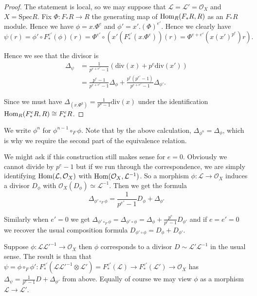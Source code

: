 \documentclass[a4paper,12pt]{book}
\newcommand{\Hom}{\textup{Hom}}
\newcommand{\Fe}[1][e]{F^{#1}_{*}}
\newcommand{\ox}[1][X]{\mathcal{O}_{#1}}
\begin{document}
\begin{proof}
	
	The statement is local, so we may suppose that $\mathcal{L}=\mathcal{L}'=\mathcal{O}_{X}$ and $X= \text{Spec}R$. Fix $\Phi: F_{*}R \to R$ the generating map of $\Hom_{R}(F_{*}R,R)$ as an $F_{*}R$ module. Hence we have $\phi=x.\Phi^{e}$ and $\phi'=x'.(\Phi)^{e'}$. Hence we clearly have $$\psi(r)=\phi'\circ F_{*}^{e'}(\phi)(r)= \Phi^{e'}\circ (x'(F_{*}^{e'}(x.\Phi^{e}))(r)=\Phi^{e+e'}(x(x')^{p^{e}})r).$$
	
	
	Hence we see that the divisor is 
	\begin{align*}
	\Delta_{\psi} &= \frac{1}{p^{e+e'}-1}(\text{div}(x) + p^{e}\text{div}(x')) \\
	&=\frac{p^{e}-1}{p^{e+e'}-1}\Delta_{\phi} + \frac{p^{e}(p^{e'}-1)}{p^{e+e'}-1}\Delta_{\phi'}.
	\end{align*}
	
	Since we must have $\Delta_{(x.\Phi^{k})}= \frac{1}{p^{k}-1} \text{div}(x)$ under the identification $\Hom_{R}(\Fe R,R) \cong \Fe R$.

	
\end{proof}

We write $\phi^{n}$ for $\phi^{n-1}\circ_{F} \phi$. Note that by the above calculation, $\Delta_{\phi^{n}}=\Delta_{\phi}$, which is why we require the second part of the equivalence relation.

\begin{remark}\label{R-twist}

We might ask if this construction still makes sense for $e=0$. Obviously we cannot divide by $p^{e}-1$ but if we run through the correspondence, we are simply identifying $\Hom(\mathcal{L},\ox)$ with $\Hom(\ox,\mathcal{L}^{-1})$. So a morphism $\phi: \mathcal{L} \to \ox$ induces a divisor $D_{\phi}$ with $\ox(D_{\phi})\simeq \mathcal{L}^{-1}$. Then we get the formula
\[\Delta_{\phi' \circ_{F} \phi}= \frac{1}{p^{e'}-1}D_{\phi} + \Delta_{\phi'}\]

Similarly when $e'=0$ we get $\Delta_{\phi' \circ_{F} \phi}=\Delta_{\phi' \circ \phi}=\Delta_{\phi} + \frac{p^{e}}{p^{e}-1}D_{\phi'}$ and if $e=e'=0$ we recover the usual composition formula $D_{\phi' \circ \phi}=D_{\phi} + D_{\phi'}$.

Suppose $\phi: \mathcal{L}\mathcal{L'}^{-1} \to \ox$ then $\phi$ corresponds to a divisor $D\sim \mathcal{L'}\mathcal{L}^{-1}$ in the usual sense. The result is than that $\psi=\phi \circ_{F} \phi': F_{*}^{e'}(\mathcal{L}\mathcal{L'}^{-1} \otimes \mathcal{L'})=F_{*}^{e'}(\mathcal{L}) \to F_{*}^{e'}(\mathcal{L'})\to\ox$ has $\Delta_{\psi}=\frac{1}{p^{e}-1}D+\Delta_{\phi'}$ from above. Equally of course we may view $\phi$ as a morphism $\mathcal{L} \to \mathcal{L'}$. 

\end{remark}
\end{document}
